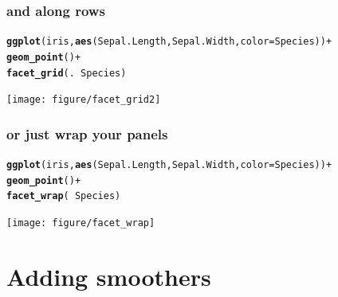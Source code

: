 \documentclass{beamer}\usepackage[]{graphicx}\usepackage[]{color}
\makeatletter
\newcommand{\hlkwd}[1]{\textcolor[rgb]{0.737,0.353,0.396}{\textbf{#1}}}%
\newenvironment{kframe}{%
 \def\at@end@of@kframe{}%
 \ifinner\ifhmode%
  \def\at@end@of@kframe{\end{minipage}}%
  \begin{minipage}{\columnwidth}%
 \fi\fi%
 \def\FrameCommand##1{\hskip\@totalleftmargin \hskip-\fboxsep
 \colorbox{shadecolor}{##1}\hskip-\fboxsep
     \hskip-\linewidth \hskip-\@totalleftmargin \hskip\columnwidth}%
 \MakeFramed {\advance\hsize-\width
   \@totalleftmargin\z@ \linewidth\hsize
   \@setminipage}}%
 {\par\unskip\endMakeFramed%
 \at@end@of@kframe}
\newenvironment{knitrout}{}{} %
\makeatother
\begin{document}

\begin{frame}[fragile]
\frametitle{and along rows}
\begin{knitrout}\footnotesize
{}\color{fgcolor}\begin{kframe}
\begin{alltt}
\hlkwd{ggplot}(iris, \hlkwd{aes}(Sepal.Length, Sepal.Width, color = Species)) +
\hlkwd{geom_point}() +
\hlkwd{facet_grid}(. ~ Species)
\end{alltt}
\end{kframe}

{\centering \texttt{[image: figure/facet\_grid2]} 

}



\end{knitrout}

\end{frame}


\begin{frame}[fragile]
\frametitle{or just wrap your panels}
\begin{knitrout}\footnotesize
{}\color{fgcolor}\begin{kframe}
\begin{alltt}
\hlkwd{ggplot}(iris, \hlkwd{aes}(Sepal.Length, Sepal.Width, color = Species)) +
\hlkwd{geom_point}() +
\hlkwd{facet_wrap}( ~ Species)
\end{alltt}
\end{kframe}

{\centering \texttt{[image: figure/facet\_wrap]} 

}



\end{knitrout}

\end{frame}


\section*{Adding smoothers}
\frame{\sectionpage}
\end{document}
